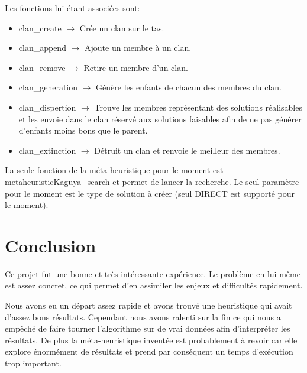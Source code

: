 \documentclass{EPUProjetPeiP}
\begin{document}
Les fonctions lui étant associées sont:\begin{itemize}
	\item clan\_create $\longrightarrow$ Crée un clan sur le tas.
	\item clan\_append $\longrightarrow$ Ajoute un membre à un clan.
	\item clan\_remove $\longrightarrow$ Retire un membre d'un clan.
	\item clan\_generation $\longrightarrow$ Génère les enfants de chacun des membres du clan.
	\item clan\_dispertion $\longrightarrow$ Trouve les membres représentant des solutions réalisables et les envoie dans le clan réservé aux solutions faisables afin de ne pas générer d'enfants moins bons que le parent.
	\item clan\_extinction $\longrightarrow$ Détruit un clan et renvoie le meilleur des membres.
	\\
\end{itemize}

La seule fonction de la méta-heuristique pour le moment est metaheuristicKaguya\_search et permet de lancer la recherche. Le seul paramètre pour le moment est le type de solution à créer (seul DIRECT est supporté pour le moment).

\chapter*{Conclusion}

\label{sec:conclusion}

Ce projet fut une bonne et très intéressante expérience. Le problème en lui-même est assez concret, ce qui permet d'en assimiler les enjeux et difficultés rapidement.

Nous avons eu un départ assez rapide et avons trouvé une heuristique qui avait d'assez bons résultats. Cependant nous avons ralenti sur la fin ce qui nous a empêché de faire tourner l'algorithme sur de vrai données afin d'interpréter les résultats. De plus la méta-heuristique inventée est probablement à revoir car elle explore énormément de résultats et prend par conséquent un temps d'exécution trop important.


\appendix
{}
\end{document}
